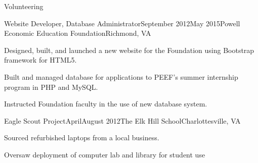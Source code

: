 \documentclass{resume} %
\begin{document}
\begin{rSection}{Volunteering}

\begin{rSubsection}{Website Developer, Database Administrator}{September 2012\textminus May 2015}{Powell Economic Education Foundation}{Richmond, VA}
\item[] Designed, built, and launched a new website for the Foundation using Bootstrap framework for HTML5.
\item[] Built and managed database for applications to PEEF's summer internship program in PHP and MySQL.
\item[] Instructed Foundation faculty in the use of new database system.
\end{rSubsection}
\begin{rSubsection}{Eagle Scout Project}{April\textminus August 2012}{The Elk Hill School}{Charlottesville, VA}
\item[] Sourced refurbished laptops from a local business.
\item[] Oversaw deployment of computer lab and library for student use
\end{rSubsection}
\end{rSection}











\end{document}
